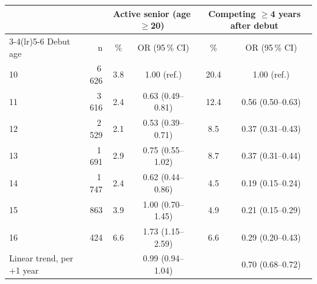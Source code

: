 \begin{tabular}{lrcccc}
\toprule
 & & \multicolumn{2}{c}{Active senior (age $\geq$20)} & \multicolumn{2}{c}{Competing $\geq$4 years after debut} \\
\cmidrule(lr){3-4}\cmidrule(lr){5-6}
Debut age & n & \% & OR (95\,\% CI) & \% & OR (95\,\% CI) \\
\midrule
10 & 6\,626 & 3.8 & 1.00 (ref.) & 20.4 & 1.00 (ref.) \\
11 & 3\,616 & 2.4 & 0.63 (0.49--0.81) & 12.4 & 0.56 (0.50--0.63) \\
12 & 2\,529 & 2.1 & 0.53 (0.39--0.71) & 8.5 & 0.37 (0.31--0.43) \\
13 & 1\,691 & 2.9 & 0.75 (0.55--1.02) & 8.7 & 0.37 (0.31--0.44) \\
14 & 1\,747 & 2.4 & 0.62 (0.44--0.86) & 4.5 & 0.19 (0.15--0.24) \\
15 & 863 & 3.9 & 1.00 (0.70--1.45) & 4.9 & 0.21 (0.15--0.29) \\
16 & 424 & 6.6 & 1.73 (1.15--2.59) & 6.6 & 0.29 (0.20--0.43) \\
\midrule
Linear trend, per +1 year &  &  & 0.99 (0.94--1.04) &  & 0.70 (0.68--0.72) \\
\bottomrule
\end{tabular}
